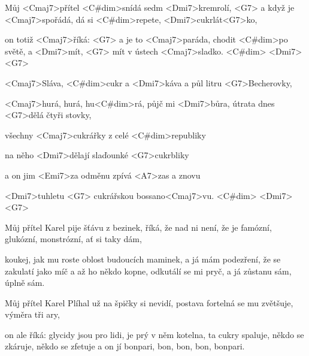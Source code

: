 

\zs
Můj <Cmaj7>přítel <C#dim>snídá sedm <Dmi7>kremrolí, <G7>
a když je <Cmaj7>spořádá, dá si <C#dim>repete,
<Dmi7>cukrlát<G7>ko,

on totiž <Cmaj7>říká: 
<G7>
a je to <Cmaj7>paráda, chodit <C#dim>po světě,
a <Dmi7>mít, <G7> mít v ústech <Cmaj7>sladko. <C#dim> 
<Dmi7> <G7>
\ks


\zr
<Cmaj7>Sláva, <C#dim>cukr a <Dmi7>káva a půl litru 
<G7>Becherovky,

<Cmaj7>hurá, hurá, hu<C#dim>rá, půjč mi <Dmi7>bůra, útrata dnes 
<G7>dělá čtyři stovky,

všechny <Cmaj7>cukrářky z celé <C#dim>republiky

na něho <Dmi7>dělají slaďounké <G7>cukrbliky

a on jim <Emi7>za odměnu zpívá <A7>zas a znovu

<Dmi7>tuhletu <G7> cukrářskou bossano<Cmaj7>vu. <C#dim> 
<Dmi7> <G7>
\kr

\zs
Můj přítel Karel pije šťávu z bezinek,
říká, že nad ni není,
že je famózní, glukózní, monstrózní, ať si taky dám,

koukej, jak mu roste oblost budoucích maminek,
a já mám podezření,
že se zakulatí jako míč
a až ho někdo kopne, odkutálí se mi pryč,
a já zůstanu sám, úplně sám.
\ks

\zr \kr

\zs
Můj přítel Karel Plíhal už na špičky si nevidí,
postava fortelná se mu zvětšuje,
výměra tři ary,

on ale říká: glycidy jsou pro lidi,
je prý v něm kotelna, ta cukry spaluje,
někdo se zkáruje, někdo se zfetuje
a on jí bonpari, bon, bon, bon, bonpari.
\ks

\zr \kr

\kp
